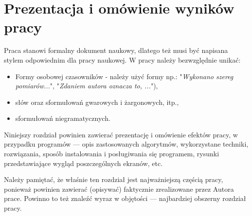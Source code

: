 \chapter{Prezentacja i omówienie wyników pracy}
\label{sec:chapterł}


Praca stanowi formalny dokument naukowy, dlatego też musi być napisana stylem odpowiednim dla pracy naukowej. W pracy należy bezwzględnie unikać:
\begin{itemize}
    \item Formy osobowej czasowników  - należy użyć formy np.:  "\textit{Wykonano szereg pomiarów...}", "\textit{Zdaniem autora oznacza to, ...}"),
    \item słów oraz sformułowań gwarowych i żargonowych, itp.,
    \item sformułowań niegramatycznych.
\end{itemize}


Niniejszy rozdział powinien zawierać prezentację i omówienie efektów pracy, 
w przypadku programów — opis zastosowanych algorytmów, wykorzystane techniki, rozwiązania, sposób instalowania i posługiwania się programem, rysunki przedstawiające wygląd poszczególnych ekranów, etc.


Należy pamiętać, że właśnie ten rozdział jest najważniejszą częścią pracy, ponieważ  powinien  zawierać  (opisywać)  faktycznie  zrealizowane  przez  Autora prace. Powinno to też znaleźć wyraz w objętości — najbardziej obszerny rozdział pracy.






